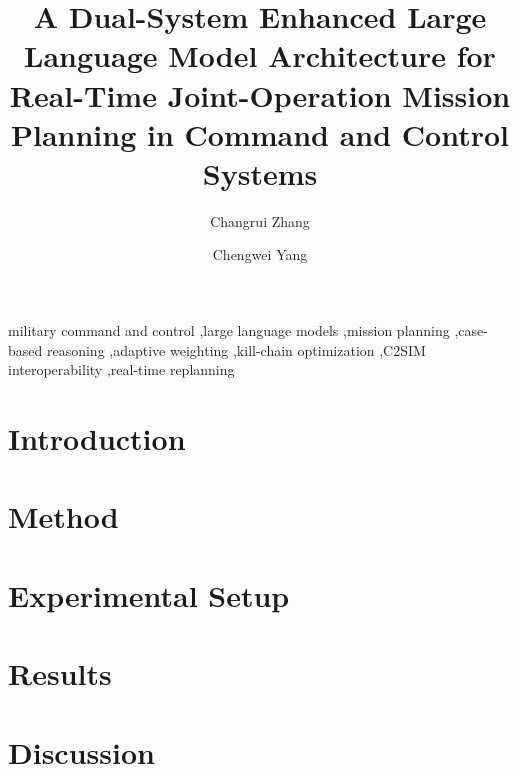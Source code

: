 \documentclass[preprint,12pt]{elsarticle}
\begin{document}
\begin{frontmatter}

\title{A Dual-System Enhanced Large Language Model Architecture for Real-Time Joint-Operation Mission Planning in Command and Control Systems}

\author[inst1]{Changrui Zhang}
\author[inst1]{Chengwei Yang}


\begin{abstract}

\end{abstract}

\begin{highlights}

\end{highlights}

\begin{keyword}
military command and control \sep large language models \sep mission planning \sep case-based reasoning \sep adaptive weighting \sep kill-chain optimization \sep C2SIM interoperability \sep real-time replanning
\end{keyword}

\end{frontmatter}

\section{Introduction}


\section{Method}


\section{Experimental Setup}


\section{Results}
\label{sec:results}


\section{Discussion}
\label{sec:discussion}

\end{document}

